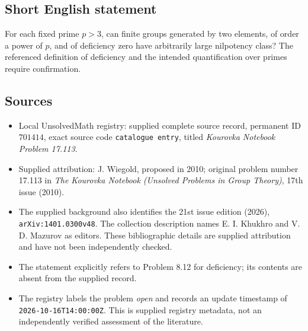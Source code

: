 \documentclass[11pt]{article}
\begin{document}
\subsection{Short English statement}
For each fixed prime \(p>3\), can finite groups generated by two elements, of order a power of \(p\), and of deficiency zero have arbitrarily large nilpotency class? The referenced definition of deficiency and the intended quantification over primes require confirmation.
\subsection{Sources}
\begin{itemize}
\item Local UnsolvedMath registry: supplied complete source record, permanent ID \(701414\), exact source code \texttt{catalogue entry}, titled \emph{Kourovka Notebook Problem 17.113}.
\item Supplied attribution: J. Wiegold, proposed in 2010; original problem number 17.113 in \emph{The Kourovka Notebook (Unsolved Problems in Group Theory)}, 17th issue (2010).
\item The supplied background also identifies the 21st issue edition (2026), \texttt{arXiv:1401.0300v48}. The collection description names E. I. Khukhro and V. D. Mazurov as editors. These bibliographic details are supplied attribution and have not been independently checked.
\item The statement explicitly refers to Problem 8.12 for deficiency; its contents are absent from the supplied record.
\item The registry labels the problem \emph{open} and records an update timestamp of \texttt{2026-10-16T14:00:00Z}. This is supplied registry metadata, not an independently verified assessment of the literature.
\end{itemize}
\end{document}
